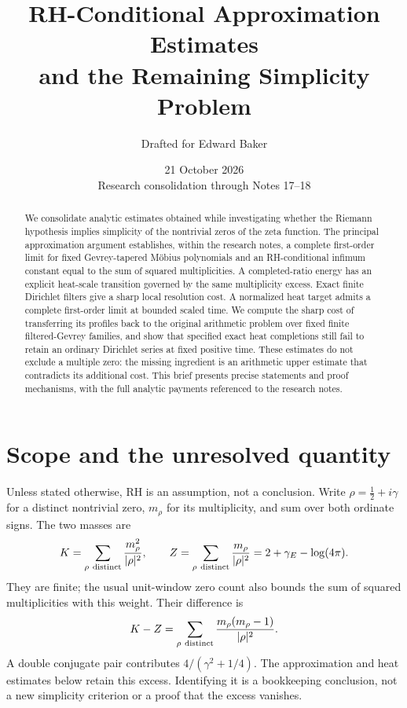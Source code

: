\documentclass[11pt]{article}
\title{RH-Conditional Approximation Estimates\\and the Remaining Simplicity Problem}
\author{Drafted for Edward Baker}
\date{21 October 2026\\\small Research consolidation through Notes 17--18}
\begin{document}
\maketitle
\begin{abstract}
We consolidate analytic estimates obtained while investigating whether the
Riemann hypothesis implies simplicity of the nontrivial zeros of the zeta
function. The principal approximation argument establishes, within the
research notes, a complete first-order limit for fixed Gevrey-tapered
M\"obius polynomials and an RH-conditional infimum constant equal to the
sum of squared multiplicities. A completed-ratio energy has an explicit
heat-scale transition governed by the same multiplicity excess. Exact
finite Dirichlet filters give a sharp local resolution cost. A normalized
heat target admits a complete first-order limit at bounded scaled time.
We compute the sharp cost of transferring its profiles back to the
original arithmetic problem over fixed finite filtered-Gevrey families,
and show that specified exact heat completions still fail to retain an
ordinary Dirichlet series at fixed positive time. These estimates do
not exclude a multiple zero: the missing ingredient is an
arithmetic upper estimate that contradicts its additional cost. This
brief presents precise statements and proof mechanisms, with the full
analytic payments referenced to the research notes.
\end{abstract}

\section{Scope and the unresolved quantity}
Unless stated otherwise, RH is an assumption, not a conclusion. Write
\(\rho=\frac12+i\gamma\) for a distinct nontrivial zero, \(m_\rho\) for
its multiplicity, and sum over both ordinate signs. The two masses are
\begin{equation}\label{eq:KZ}
 K=\sum_{\rho\ {\rm distinct}}\frac{m_\rho^2}{|\rho|^2},
 \qquad
 Z=\sum_{\rho\ {\rm distinct}}\frac{m_\rho}{|\rho|^2}
   =2+\gamma_E-\log(4\pi).
\end{equation}
They are finite; the usual unit-window zero count also bounds the sum
of squared multiplicities with this weight. Their difference is
\begin{equation}\label{eq:gap}
 K-Z=\sum_{\rho\ {\rm distinct}}
            \frac{m_\rho(m_\rho-1)}{|\rho|^2}.
\end{equation}
A double conjugate pair contributes \(4/(\gamma^2+1/4)\).
The approximation and heat estimates below retain this excess.
Identifying it is a bookkeeping conclusion, not a new simplicity
criterion or a proof that the excess vanishes.
\end{document}
